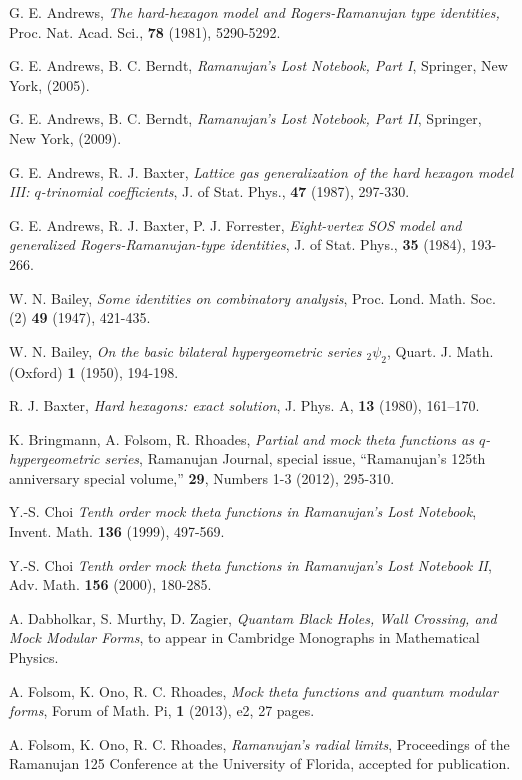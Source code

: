 \documentclass[12pt,reqno]{amsart}
\theoremstyle{remark}
\theoremstyle{definition}
\numberwithin{theorem}{section} \numberwithin{equation}{section}
\numberwithin{example}{section}
\begin{document}
{\begin{thebibliography}{999999}
 G. E. Andrews, {\em The hard-hexagon model and Rogers-Ramanujan type identities,} Proc. Nat. Acad. Sci., {\bf 78} (1981), 5290-5292.

 G. E. Andrews, B. C. Berndt,  {\em Ramanujan's Lost Notebook, Part I}, Springer, New York, (2005).

 G. E. Andrews, B. C. Berndt,  {\em Ramanujan's Lost Notebook, Part II}, Springer, New York, (2009).

 G. E. Andrews, R. J. Baxter, {\em Lattice gas generalization of the hard hexagon model III: $q$-trinomial coefficients}, J. of Stat. Phys., {\bf 47} (1987), 297-330.

 G. E. Andrews, R. J. Baxter, P. J. Forrester, {\em Eight-vertex SOS model and generalized Rogers-Ramanujan-type identities}, J. of Stat. Phys., {\bf 35} (1984), 193-266.

 W. N. Bailey, {\em Some identities on combinatory analysis}, Proc. Lond. Math. Soc. (2) {\bf 49} (1947),  421-435.

 W. N. Bailey, {\em On the basic bilateral hypergeometric series ${}_2\psi_2$}, Quart. J. Math. (Oxford) {\bf 1} (1950), 194-198.

 R. J.  Baxter, {\em Hard hexagons: exact solution}, J. Phys. A, {\bf 13} (1980), 161--170.

 K. Bringmann, A. Folsom, R. Rhoades, {\em Partial and mock theta functions as $q$-hypergeometric series}, Ramanujan Journal, special issue, ``Ramanujan's 125th anniversary special volume,'' {\bf 29}, Numbers 1-3 (2012), 295-310.

 Y.-S. Choi {\em Tenth order mock theta functions in Ramanujan's Lost Notebook}, Invent. Math. {\bf 136} (1999),  497-569.

 Y.-S. Choi {\em Tenth order mock theta functions in Ramanujan's Lost Notebook II}, Adv. Math. {\bf 156} (2000),  180-285.

 A. Dabholkar, S. Murthy, D. Zagier, {\em Quantam Black Holes, Wall Crossing, and Mock Modular Forms}, to appear in Cambridge Monographs in Mathematical Physics.

 A. Folsom, K. Ono, R. C. Rhoades, {\em Mock theta functions and quantum modular forms}, Forum of Math. Pi, {\bf 1} (2013), e2, 27 pages.

 A. Folsom, K. Ono, R. C. Rhoades, {\em Ramanujan's radial limits}, Proceedings of the Ramanujan 125 Conference at the University of Florida, accepted for publication.


\end{thebibliography}}
\end{document}
